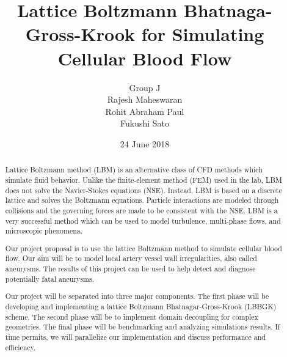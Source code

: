 \documentclass{article}
\title{Lattice Boltzmann Bhatnaga-Gross-Krook for Simulating Cellular Blood Flow}
\date{24 June 2018}
\author{Group J\\ Rajesh Maheswaran\\ Rohit Abraham Paul\\ Fukushi Sato}
\begin{document}
\maketitle

\begin{abstract}

\noindent
Lattice Boltzmann method (LBM) is an alternative class of CFD methods which simulate fluid behavior. Unlike the finite-element method (FEM) used in the lab, LBM does not solve the Navier-Stokes equations (NSE). Instead, LBM is based on a discrete lattice and solves the Boltzmann equations. Particle interactions are modeled through collisions and the governing forces are made to be consistent with the NSE. LBM is a very successful method which can be used to model turbulence, multi-phase flows, and microscopic phenomena. 

\noindent
Our project proposal is to use the lattice Boltzmann method to simulate cellular blood flow. Our aim will be to model local artery vessel wall irregularities, also called aneurysms. The results of this project can be used to help detect and diagnose potentially fatal aneurysms.
	
\noindent
Our project will be separated into three major components. The first phase will be developing and implementing a lattice Boltzmann Bhatnagar-Gross-Krook (LBBGK) scheme. The second phase will be to implement domain decoupling for complex geometries. The final phase will be benchmarking and analyzing simulations results. If time permits, we will parallelize our implementation and discuss performance and efficiency.
\end{abstract}
\end{document}

